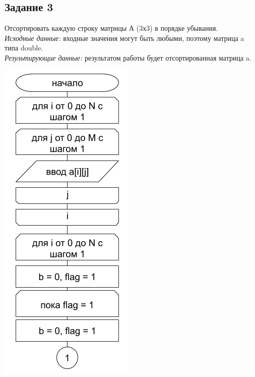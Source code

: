 \documentclass[a4paper,14pt]{extarticle}
\begin{document}
\subsection{Задание 3}
Отсортировать каждую строку матрицы А (3х3) в порядке убывания.\\
\textit{Исходные данные:} входные значения могут быть любыми, поэтому матрица a типа double.\\
\textit{Результирующие данные:} результатом работы будет отсортированная матрица a.\\
\begin{center}
\includegraphics[scale=0.6]{lab4-3-1.png}\\

\end{center}
\end{document}
